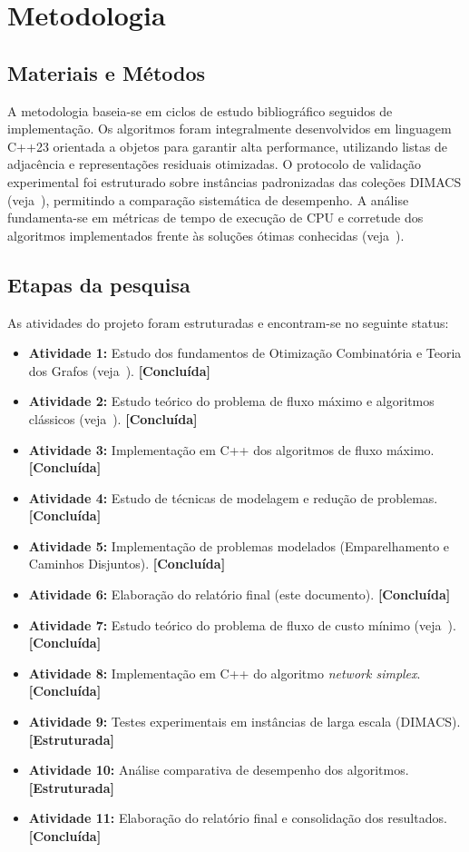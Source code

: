 \section{Metodologia}\label{sec:metodologia}
\subsection{Materiais e Métodos}
A metodologia baseia-se em ciclos de estudo bibliográfico seguidos de implementação. Os algoritmos foram integralmente desenvolvidos em linguagem C++23 orientada a objetos para garantir alta performance, utilizando listas de adjacência e representações residuais otimizadas.
O protocolo de validação experimental foi estruturado sobre instâncias padronizadas das coleções DIMACS (veja~\cite{Jensen2022}), permitindo a comparação sistemática de desempenho. A análise fundamenta-se em métricas de tempo de execução de CPU e corretude dos algoritmos implementados frente às soluções ótimas conhecidas (veja~\cite{ford1956maximal}).

\subsection{Etapas da pesquisa}
As atividades do projeto foram estruturadas e encontram-se no seguinte status:
\begin{itemize}
    \item \textbf{Atividade 1:} Estudo dos fundamentos de Otimização Combinatória e Teoria dos Grafos (veja~\cite{cook1998combinatorial}). \textbf{[Concluída]}
    \item \textbf{Atividade 2:} Estudo teórico do problema de fluxo máximo e algoritmos clássicos (veja~\cite{ford1956maximal, edmonds1972theoretical, dinic1970algorithm, goldberg1988new}). \textbf{[Concluída]}
    \item \textbf{Atividade 3:} Implementação em C++ dos algoritmos de fluxo máximo. \textbf{[Concluída]}
    \item \textbf{Atividade 4:} Estudo de técnicas de modelagem e redução de problemas. \textbf{[Concluída]}
    \item \textbf{Atividade 5:} Implementação de problemas modelados (Emparelhamento e Caminhos Disjuntos). \textbf{[Concluída]}
    \item \textbf{Atividade 6:} Elaboração do relatório final (este documento). \textbf{[Concluída]}
    \item \textbf{Atividade 7:} Estudo teórico do problema de fluxo de custo mínimo (veja~\cite{cook1998combinatorial}). \textbf{[Concluída]}
    \item \textbf{Atividade 8:} Implementação em C++ do algoritmo \textit{network simplex}. \textbf{[Concluída]}
    \item \textbf{Atividade 9:} Testes experimentais em instâncias de larga escala (DIMACS). \textbf{[Estruturada]}
    \item \textbf{Atividade 10:} Análise comparativa de desempenho dos algoritmos. \textbf{[Estruturada]}
    \item \textbf{Atividade 11:} Elaboração do relatório final e consolidação dos resultados. \textbf{[Concluída]}
\end{itemize}

